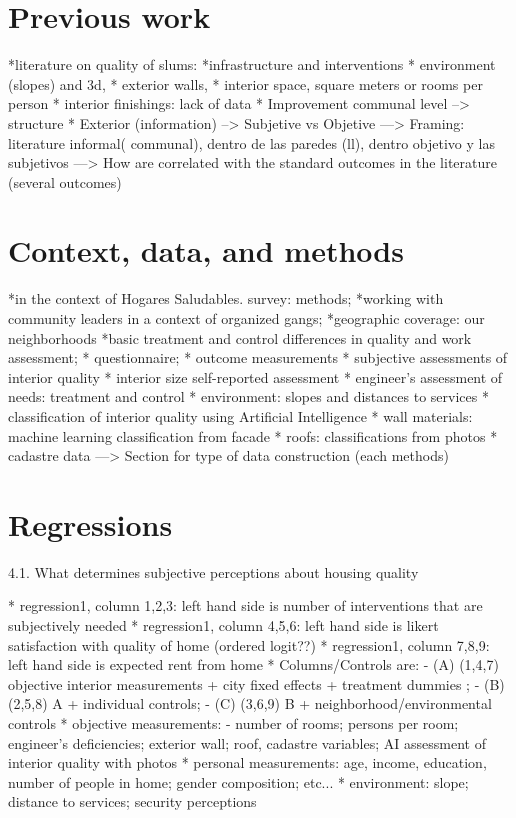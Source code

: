 \section{Previous work}

*literature on quality of slums: 
*infrastructure and interventions
* environment (slopes) and 3d, 
* exterior walls, 
* interior space, square meters or rooms per person
* interior finishings: lack of data
* Improvement communal level --> structure
* Exterior (information) --> Subjetive vs Objetive
---> Framing: literature informal( communal), dentro de las paredes (ll), dentro objetivo y las subjetivos
---> How are correlated with the standard outcomes in the literature (several outcomes)

\section{Context, data, and methods}

*in the context of Hogares Saludables. survey: methods; 
*working with community leaders in a context of organized gangs; 
*geographic coverage: our neighborhoods
*basic treatment and control differences in quality and work assessment; 
* questionnaire;
* outcome measurements
* subjective assessments of interior quality
* interior size self-reported assessment
* engineer's assessment of needs: treatment and control
* environment: slopes and distances to services
* classification of interior quality using Artificial Intelligence
* wall materials: machine learning classification from facade
* roofs: classifications from photos
* cadastre data
---> Section for type of data construction (each methods)

\section{Regressions}

4.1. What determines subjective perceptions about housing quality

* regression1, column 1,2,3: left hand side is number of interventions that are subjectively needed
* regression1, column 4,5,6: left hand side is likert satisfaction with quality of home (ordered logit??)
* regression1, column 7,8,9: left hand side is expected rent from home
* Columns/Controls are: 
        - (A) (1,4,7) objective interior measurements + city fixed effects + treatment dummies ; 
        - (B) (2,5,8) A + individual controls; 
        - (C) (3,6,9) B + neighborhood/environmental controls
* objective measurements: 
        - number of rooms; persons per room;  engineer's deficiencies; exterior wall; roof, cadastre variables; AI assessment of interior quality with photos
* personal measurements: age, income, education, number of people in home; gender composition; etc...
* environment: slope; distance to services; security perceptions



